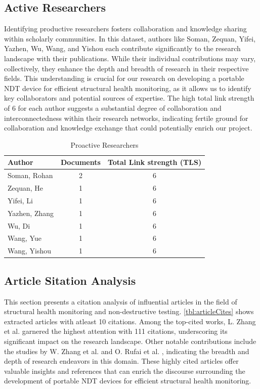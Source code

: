 \documentclass[journal, a4paper]{IEEEtran}
\begin{document}
\subsection{Active Researchers}
Identifying productive researchers fosters collaboration and knowledge sharing within scholarly communities.
In this dataset, authors like Soman, Zequan, Yifei, Yazhen, Wu, Wang, and Yishou each contribute significantly
to the research landscape with their publications.
While their individual contributions may vary, collectively,
they enhance the depth and breadth of research in their respective fields.
This understanding is crucial for our research on developing a portable NDT device for efficient structural health monitoring,
as it allows us to identify key collaborators and potential sources of expertise.
The high total link strength of 6 for each author suggests a substantial degree of collaboration and
interconnectedness within their research networks, indicating fertile ground for collaboration and knowledge
exchange that could potentially enrich our project.


\begin{table}[h]

  \centering
  \caption{Proactive Researchers}
  \label{tbl:bresearchers}
  \begin{tabular}{lcc}

      \toprule
      \textbf{Author} & \textbf{Documents} & \textbf{Total Link strength (TLS)} \\
      \midrule
      Soman, Rohan & 2 & 6 \\
      Zequan, He & 1 & 6 \\
      Yifei, Li & 1 & 6 \\
      Yazhen, Zhang & 1 & 6 \\
      Wu, Di & 1 & 6 \\
      Wang, Yue & 1 & 6 \\
      Wang, Yishou & 1 & 6 \\
      \bottomrule
  \end{tabular}
\end{table}


\subsection{Article Sitation Analysis}
This section presents a citation analysis of influential articles in the field of structural health monitoring and non-destructive testing.
\autoref{tbl:articleCites} shows extracted articles with atleast 10 citations.
Among the top-cited works, L. Zhang et al. \cite{zhang_structural_2021} garnered the highest attention with 111 citations,
underscoring its significant impact on the research landscape.
Other notable contributions include the studies by W. Zhang et al. \cite{zhang_defect_2020}
and O. Rufai et al. \cite{rufai_cure_2020}, indicating the breadth and depth of research endeavors in this domain.
These highly cited articles offer valuable insights and references
that can enrich the discourse surrounding the development of portable NDT devices for efficient structural health monitoring.
\end{document}
